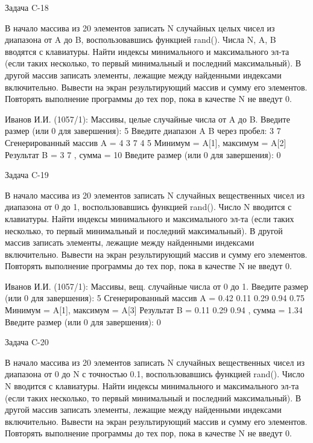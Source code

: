 Задача C-18

В начало массива из 20 элементов записать N случайных целых чисел из диапазона
от A до B, воспользовавшись функцией rand(). Числа N, A, B вводятся с
клавиатуры. Найти индексы минимального и максимального эл-та (если таких
несколько, то первый минимальный и последний максимальный). В другой массив
записать элементы, лежащие между найденными индексами включительно. Вывести на
экран результирующий массив и сумму его элементов. Повторять выполнение
программы до тех пор, пока в качестве N не введут 0.

Иванов И.И. (1057/1): Массивы, целые случайные числа от A до B.
Введите размер (или 0 для завершения): 5
Введите диапазон A B через пробел: 3 7
Сгенерированный массив A = { 4 3 7 4 5 }
Минимум = A[1], максимум = A[2]
Результат B = { 3 7 }, сумма = 10
Введите размер (или 0 для завершения): 0


Задача C-19

В начало массива из 20 элементов записать N случайных вещественных чисел из
диапазона от 0 до 1, воспользовавшись функцией rand(). Число N вводится с
клавиатуры. Найти индексы минимального и максимального эл-та (если таких
несколько, то первый минимальный и последний максимальный). В другой массив
записать элементы, лежащие между найденными индексами включительно. Вывести на
экран результирующий массив и сумму его элементов. Повторять выполнение
программы до тех пор, пока в качестве N не введут 0.

Иванов И.И. (1057/1): Массивы, вещ. случайные числа от 0 до 1.
Введите размер (или 0 для завершения): 5
Сгенерированный массив A = { 0.42 0.11 0.29 0.94 0.75 }
Минимум = A[1], максимум = A[3]
Результат B = { 0.11 0.29 0.94 }, сумма = 1.34
Введите размер (или 0 для завершения): 0


Задача C-20

В начало массива из 20 элементов записать N случайных вещественных чисел из
диапазона от 0 до N с точностью 0.1, воспользовавшись функцией rand(). Число N
вводится с клавиатуры. Найти индексы минимального и максимального эл-та (если
таких несколько, то первый минимальный и последний максимальный). В другой
массив записать элементы, лежащие между найденными индексами включительно.
Вывести на экран результирующий массив и сумму его элементов. Повторять
выполнение программы до тех пор, пока в качестве N не введут 0.

